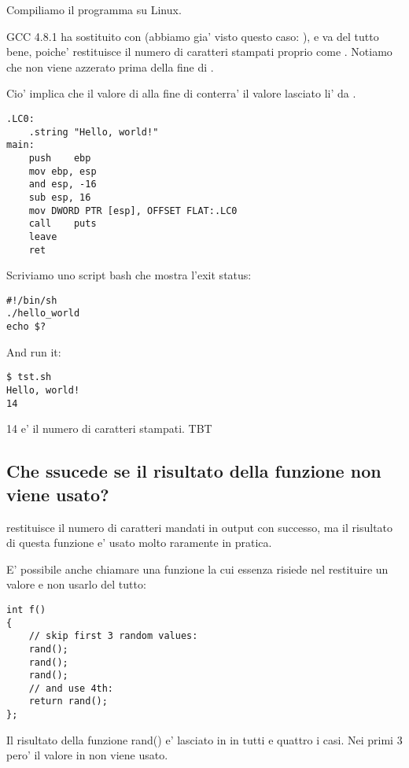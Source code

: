 Compiliamo il programma su Linux.

GCC 4.8.1 ha sostituito \printf con \puts 
(abbiamo gia' visto questo caso: ), e va del tutto bene, poiche' \puts restituisce il numero di caratteri stampati proprio come \printf.
Notiamo che \EAX non viene azzerato prima della fine di \main.

Cio' implica che il valore di \EAX alla fine di \main conterra' il valore lasciato li' da \puts.

\begin{lstlisting}[caption=GCC 4.8.1,style=customasmx86]
.LC0:
	.string	"Hello, world!"
main:
	push	ebp
	mov	ebp, esp
	and	esp, -16
	sub	esp, 16
	mov	DWORD PTR [esp], OFFSET FLAT:.LC0
	call	puts
	leave
	ret
\end{lstlisting}


Scriviamo uno script bash che mostra l'exit status:

\begin{lstlisting}[caption=tst.sh]
#!/bin/sh
./hello_world
echo $?
\end{lstlisting}

And run it:

\begin{lstlisting}
$ tst.sh 
Hello, world!
14
\end{lstlisting}

14 e' il numero di caratteri stampati.
\ac{TBT}

\subsection{Che ssucede se il risultato della funzione non viene usato?}

\printf restituisce il numero di caratteri mandati in output con successo, ma il risultato di questa funzione
e' usato molto raramente in pratica.

E' possibile anche chiamare una funzione la cui essenza risiede nel restituire un valore e non usarlo del tutto:

\begin{lstlisting}[style=customc]
int f()
{
    // skip first 3 random values:
    rand();
    rand();
    rand();
    // and use 4th:
    return rand();
};
\end{lstlisting}

Il risultato della funzione rand() e' lasciato in \EAX in tutti e quattro i casi.
Nei primi 3 pero' il valore in \EAX non viene usato.


